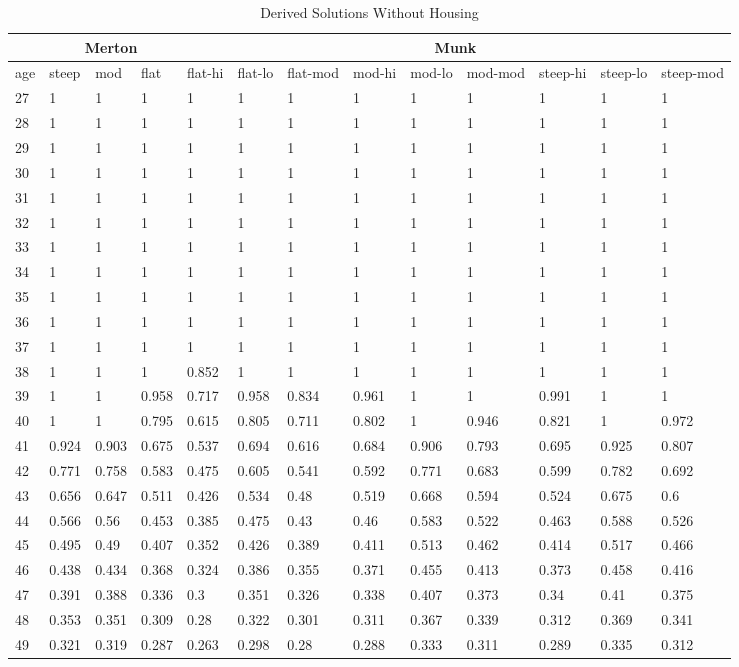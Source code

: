 \begin{table}
	\centering
	\caption[]{Derived Solutions Without Housing}
	\begin{tabular}[c]{|l|p{0.9cm}|p{0.9cm}|p{0.9cm}|p{0.9cm}|p{0.9cm}|p{0.9cm}|p{0.9cm}|p{0.9cm}|p{0.9cm}|p{0.9cm}|p{0.9cm}|p{0.9cm}|}
		\hline
		&\multicolumn{3}{|c|}{Merton}&\multicolumn{9}{c|}{Munk}\\
		\hline
		age&steep&mod&flat&flat-hi&flat-lo&flat-mod&mod-hi&mod-lo&mod-mod&steep-hi&steep-lo&steep-mod\\
		\hline
27&1&1&1&1&1&1&1&1&1&1&1&1\\
28&1&1&1&1&1&1&1&1&1&1&1&1\\
29&1&1&1&1&1&1&1&1&1&1&1&1\\
30&1&1&1&1&1&1&1&1&1&1&1&1\\
31&1&1&1&1&1&1&1&1&1&1&1&1\\
32&1&1&1&1&1&1&1&1&1&1&1&1\\
33&1&1&1&1&1&1&1&1&1&1&1&1\\
34&1&1&1&1&1&1&1&1&1&1&1&1\\
35&1&1&1&1&1&1&1&1&1&1&1&1\\
36&1&1&1&1&1&1&1&1&1&1&1&1\\
37&1&1&1&1&1&1&1&1&1&1&1&1\\
38&1&1&1&0.852&1&1&1&1&1&1&1&1\\
39&1&1&0.958&0.717&0.958&0.834&0.961&1&1&0.991&1&1\\
40&1&1&0.795&0.615&0.805&0.711&0.802&1&0.946&0.821&1&0.972\\
41&0.924&0.903&0.675&0.537&0.694&0.616&0.684&0.906&0.793&0.695&0.925&0.807\\
42&0.771&0.758&0.583&0.475&0.605&0.541&0.592&0.771&0.683&0.599&0.782&0.692\\
43&0.656&0.647&0.511&0.426&0.534&0.48&0.519&0.668&0.594&0.524&0.675&0.6\\
44&0.566&0.56&0.453&0.385&0.475&0.43&0.46&0.583&0.522&0.463&0.588&0.526\\
45&0.495&0.49&0.407&0.352&0.426&0.389&0.411&0.513&0.462&0.414&0.517&0.466\\
46&0.438&0.434&0.368&0.324&0.386&0.355&0.371&0.455&0.413&0.373&0.458&0.416\\
47&0.391&0.388&0.336&0.3&0.351&0.326&0.338&0.407&0.373&0.34&0.41&0.375\\
48&0.353&0.351&0.309&0.28&0.322&0.301&0.311&0.367&0.339&0.312&0.369&0.341\\
49&0.321&0.319&0.287&0.263&0.298&0.28&0.288&0.333&0.311&0.289&0.335&0.312\\

\end{tabular}
\end{table}
